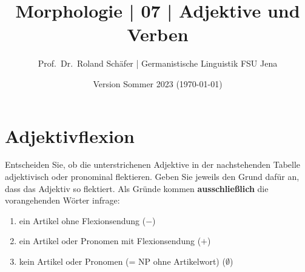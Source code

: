 \documentclass[12pt,a4paper,twoside]{article}
\author{Prof.\ Dr.\ Roland Schäfer | Germanistische Linguistik FSU Jena}
\title{Morphologie | 07 | Adjektive und Verben}
\date{Version Sommer 2023 (\today)}
\newcommand{\Zeile}{\vspace{\baselineskip}}
\newcommand{\Lf}{
  \setlength{\itemsep}{1pt}
  \setlength{\parskip}{0pt}
  \setlength{\parsep}{0pt}
}
\begin{document}
\maketitle

\Zeile

\section{Adjektivflexion}

Entscheiden Sie, ob die unterstrichenen Adjektive in der nachstehenden Tabelle adjektivisch oder pronominal flektieren.
Geben Sie jeweils den Grund dafür an, dass das Adjektiv so flektiert.
Als Gründe kommen \textbf{ausschließlich} die vorangehenden Wörter infrage:

\begin{enumerate}\Lf
  \item ein Artikel ohne Flexionsendung ($-$)
  \item ein Artikel oder Pronomen mit Flexionsendung ($+$)
  \item kein Artikel oder Pronomen (= NP ohne Artikelwort) ($\emptyset$)
\end{enumerate}
\end{document}
